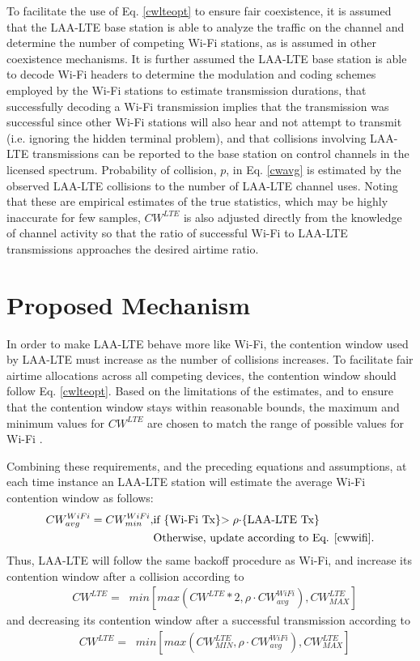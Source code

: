 To facilitate the use of Eq. \ref{cwlteopt} to ensure fair coexistence, it is assumed that the \mbox{LAA-LTE} base station is able to analyze the traffic on the channel and determine the number of competing \mbox{Wi-Fi} stations, as is assumed in other coexistence mechanisms.  It is further assumed the \mbox{LAA-LTE} base station is able to decode \mbox{Wi-Fi} headers to determine the modulation and coding schemes employed by the \mbox{Wi-Fi} stations to estimate transmission durations, that successfully decoding a \mbox{Wi-Fi} transmission implies that the transmission was successful since other \mbox{Wi-Fi} stations will also hear and not attempt to transmit (i.e. ignoring the hidden terminal problem), and that collisions involving \mbox{LAA-LTE} transmissions can be reported to the base station on control channels in the licensed spectrum.  Probability of collision, $p$, in Eq. \ref{cwavg} is estimated by the observed \mbox{LAA-LTE} collisions to the number of \mbox{LAA-LTE} channel uses.  Noting that these are empirical estimates of the true statistics, which may be highly inaccurate for few samples, $CW^{LTE}$ is also adjusted directly from the knowledge of channel activity so that the ratio of successful \mbox{Wi-Fi} to \mbox{LAA-LTE} transmissions approaches the desired airtime ratio. 


\section{Proposed Mechanism}
\label{proposed}
In order to make \mbox{LAA-LTE} behave more like \mbox{Wi-Fi}, the contention window used by \mbox{LAA-LTE} must increase as the number of collisions increases.  To facilitate fair airtime allocations across all competing devices, the contention window should follow Eq. \ref{cwlteopt}.  Based on the limitations of the estimates, and to ensure that the contention window stays within reasonable bounds, the maximum and minimum values for $CW^{LTE}$ are chosen to match the range of possible values for \mbox{Wi-Fi} \cite{80211}.  

Combining these requirements, and the preceding equations and assumptions, at each time instance an \mbox{LAA-LTE} station will estimate the average \mbox{Wi-Fi} contention window as follows:
\begin{align*}
CW^{WiFi}_{avg} = CW^{WiFi}_{min}, &\text{if \{\mbox{Wi-Fi} Tx\}$> \rho\cdot$\{\mbox{LAA-LTE} Tx\}}\\ 
&\text{Otherwise, update according to Eq. \ref{cwwifi}.}
\end{align*}
Thus, \mbox{LAA-LTE} will follow the same backoff procedure as \mbox{Wi-Fi}, and increase its contention window after a collision according to
\begin{align}
&CW^{LTE}=\;\;min\left[max\left(CW^{LTE}*2,\rho \cdot CW^{WiFi}_{avg}\right), CW^{LTE}_{MAX}\right]
\end{align}
and decreasing its contention window after a successful transmission according to 
\begin{align}
&CW^{LTE}=\;\;min\left[max\left(CW^{LTE}_{MIN},\rho \cdot CW^{WiFi}_{avg}\right), CW^{LTE}_{MAX}\right]
\end{align}


